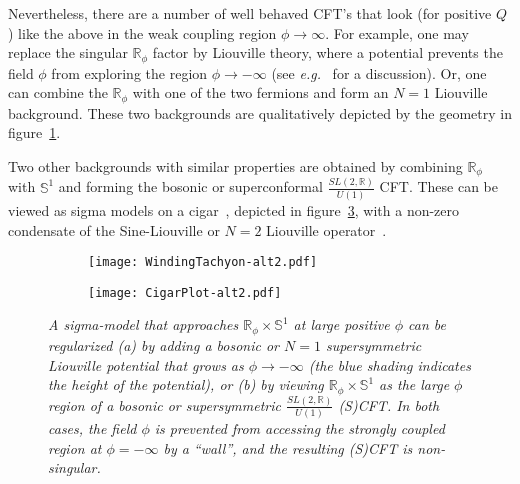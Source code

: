 \documentclass[12pt]{article}
\def\sltwo{\ensuremath{SL(2,\bR)}}
\def\eg{{e.g.}}
\newcommand{\bR}{{\mathbb R}}
\newcommand{\bS}{{\mathbb S}}
\numberwithin{equation}{section}
\def\eg{{\it e.g.}}
\def\eg{{\it e.g.}}
\begin{document}
Nevertheless, there are a number of well behaved CFT's that look (for positive $Q$) like the above in the weak coupling region $\phi\to\infty$. For example, one may replace the singular $\bR_\phi$ factor by Liouville theory, where a potential prevents the field $\phi$ from exploring the region $\phi\to-\infty$ (see \eg~ for a discussion).  Or, one can combine the $\bR_\phi$ with one of the two fermions and form an $N=1$ Liouville background.  These two backgrounds are qualitatively depicted by the geometry in figure~\ref{fig:WindingTachyon}. 

Two other backgrounds with similar properties are obtained by combining $\bR_\phi$ with $\bS^1$ and forming the bosonic or superconformal $\frac{\sltwo}{U(1)}$ CFT. These can be viewed as sigma models on a cigar~, depicted in figure~\ref{fig:CigarPlot}, with a non-zero condensate of the Sine-Liouville or $N=2$ Liouville operator~. 


\begin{figure}[ht]
\centering
 \begin{subfigure}[b]{0.4\textwidth}
  \hskip 0cm
    \texttt{[image: WindingTachyon-alt2.pdf]}
    \caption{ }
    \label{fig:WindingTachyon}
  \end{subfigure}
% 
\qquad\qquad
  \begin{subfigure}[b]{0.4\textwidth}
      \hskip 0cm
    \texttt{[image: CigarPlot-alt2.pdf]}
    \caption{ }
    \label{fig:CigarPlot}
  \end{subfigure}
\caption{\it A sigma-model that approaches $\mathbb{R}_\phi\times \bS^1$ at large positive $\phi$ can be regularized (a) by adding a bosonic or $N=1$ supersymmetric Liouville potential that grows as $\phi\to-\infty$ (the blue shading indicates the height of the potential), or (b) by viewing $\mathbb{R}_\phi\times \bS^1$ as the large $\phi$ region of a bosonic or supersymmetric $\frac{\sltwo}{U(1)}$ (S)CFT. In both cases, the field $\phi$ is prevented from accessing the strongly coupled region at $\phi=-\infty$ by a ``wall'', and the resulting (S)CFT is non-singular.}
\end{figure}
\vspace{1mm}
\end{document}

